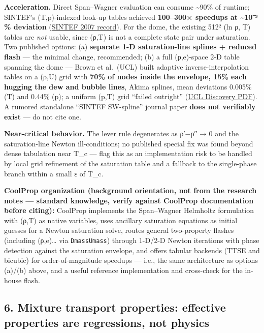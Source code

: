 \textbf{Acceleration.} Direct Span--Wagner evaluation can consume
\textasciitilde90\% of runtime; SINTEF's (T,p)-indexed look-up tables
achieved \textbf{100--300× speedups at \textasciitilde10⁻³ \% deviation}
(\href{https://www.sintef.no/en/publications/publication/1274087}{SINTEF
2007 record}). For the dome, the existing 512² (ln ρ, T) tables are
\emph{not} usable, since (ρ,T) is not a complete state pair under
saturation. Two published options: (a) \textbf{separate 1-D
saturation-line splines + reduced flash} --- the minimal change,
recommended; (b) a full (ρ,e)-space 2-D table spanning the dome ---
Brown et al.~(UCL) built adaptive inverse-interpolation tables on a
(ρ,U) grid with \textbf{70\% of nodes inside the envelope, 15\% each
hugging the dew and bubble lines}, Akima splines, mean deviations
0.005\% (T) and 0.44\% (p); a uniform (p,T) grid ``failed outright''
(\href{https://discovery.ucl.ac.uk/1522588/1/Brown\%20et\%20al\%20Thermodynamic\%20interpolation\%20for\%20the\%20simulation\%20of\%20two-phase\%20flow\%20of\%20non-ideal\%20mixtures\%20AAM.pdf}{UCL
Discovery PDF}). A rumored standalone ``SINTEF SW-spline'' journal paper
\textbf{does not verifiably exist} --- do not cite one.

\textbf{Near-critical behavior.} The lever rule degenerates as ρ′−ρ″ → 0
and the saturation-line Newton ill-conditions; no published special fix
was found beyond dense tabulation near T\_c --- flag this as an
implementation risk to be handled by local grid refinement of the
saturation table and a fallback to the single-phase branch within a
small ε of T\_c.

\textbf{CoolProp organization (background orientation, not from the
research notes --- standard knowledge, verify against CoolProp
documentation before citing):} CoolProp implements the Span--Wagner
Helmholtz formulation with (ρ,T) as native variables, uses ancillary
saturation equations as initial guesses for a Newton saturation solve,
routes general two-property flashes (including (ρ,e)\ldots{} via
\texttt{DmassUmass}) through 1-D/2-D Newton iterations with phase
detection against the saturation envelope, and offers tabular backends
(TTSE and bicubic) for order-of-magnitude speedups --- i.e., the same
architecture as options (a)/(b) above, and a useful reference
implementation and cross-check for the in-house flash.

\hypertarget{mixture-transport-properties-effective-properties-are-regressions-not-physics}{%
\subsection{6. Mixture transport properties: effective properties are
regressions, not
physics}\label{mixture-transport-properties-effective-properties-are-regressions-not-physics}}

